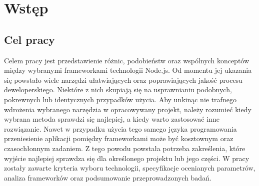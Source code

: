 \documentclass[12pt]{report}
\begin{document}
\tableofcontents
\chapter{Wstęp}

  \section{Cel pracy}
    Celem pracy jest przedstawienie różnic, podobieństw oraz wspólnych konceptów między wybranymi frameworkami technologii Node.js.
    Od momentu jej ukazania się powstało wiele narzędzi ułatwiających oraz poprawiających jakość procesu deweloperskiego.
    Niektóre z nich skupiają się na usprawnianiu podobnych, pokrewnych lub identycznych przypadków użycia.
    Aby unkinąc nie trafnego wdrożenia wybranego narzędzia w opracowywany projekt, należy rozumieć kiedy wybrana metoda sprawdzi się najlepiej, a kiedy warto zastosować inne rozwiązanie.
    Nawet w przypadku użycia tego samego języka programowania przeniesienie aplikacji pomiędzy frameworkami może być kosztownym oraz czasochłonnym zadaniem.
    Z tego powodu powstała potrzeba zakreślenia, które wyjście najlepiej sprawdza się dla określonego projektu lub jego części.
    \newline
    W pracy zostały zawarte kryteria wyboru technologii, specyfikacje ocenianych parametrów, analiza frameworków oraz podsumowanie przeprowadzonych badań.
\end{document}
